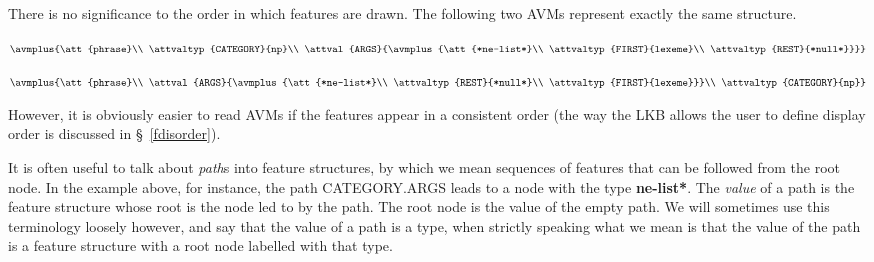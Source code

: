 \documentclass[12pt]{report}
\begin{document}
There is no significance to the order in which features are
drawn.  The following two AVMs represent exactly the same structure.
\begin{center}
{\tiny
$\avmplus{\att{phrase}\\
\attvaltyp{CATEGORY}{np}\\
\attval{ARGS}{\avmplus{\att{*ne-list*}\\
\attvaltyp{FIRST}{lexeme}\\                                                
\attvaltyp{REST}{*null*}}}}$}

{\tiny
$\avmplus{\att{phrase}\\
\attval{ARGS}{\avmplus{\att{*ne-list*}\\                                         
\attvaltyp{REST}{*null*}\\
\attvaltyp{FIRST}{lexeme}}}\\       
\attvaltyp{CATEGORY}{np}}$}
\end{center}
However, it is obviously easier to read AVMs if the features
appear in a consistent order (the way the LKB allows the user to define
display order is discussed in \S~\ref{fdisorder}).

It is often useful to talk about {\it path}s into feature
structures, by which
we mean sequences of features that
can be followed from the root node.  In the example above, for instance,
the path CATEGORY.ARGS leads to a node with the type {\bf *ne-list*}.  
The {\it value} of
a path is the feature structure whose root is the node led to by the
path.  
The root node is the value of the empty path.  
We will sometimes use this terminology loosely however,
and say that the value of a path is a type, when strictly speaking
what we mean is that the value of the path is a feature structure
with a root node labelled with that type.
\end{document}
